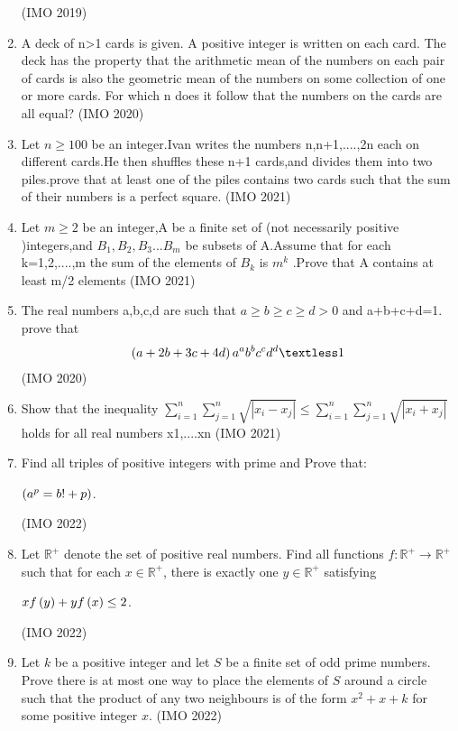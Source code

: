 \begin{enumerate}
\begin{enumerate}
\end{enumerate}
\hfill(IMO 2019)
\item A deck of n\textgreater1 cards is given. A positive integer is written on each card. The deck
has the property that the arithmetic mean of the numbers on each pair of cards is also the geometric
mean of the numbers on some collection of one or more cards.
For which n does it follow that the numbers on the cards are all equal?
\hfill(IMO 2020)
\item Let $ n\geq 100$ be an integer.Ivan writes the numbers n,n+1,....,2n each on different cards.He then shuffles these n+1 cards,and divides them into two piles.prove that at least one of the piles contains two cards such that the sum of their numbers is a perfect square.
\hfill(IMO 2021)
\item Let $ m \geq 2$ be an integer,A be a finite set of (not necessarily positive )integers,and $B_{1},B_{2},B_{3}...B_{m}$ be subsets of A.Assume that for each k=1,2,....,m the sum of the elements of $B_{k}$ is $m^k$ .Prove that A contains at least m/2 elements
\hfill(IMO 2021)
\item The real numbers a,b,c,d are such that  $a\geq b\geq c\geq d>0$ and a+b+c+d=1. prove that
\begin{align}
    \brak {a+2b+3c+4d}a^a b^b c^c d^d \textless 1
\end{align}
\hfill(IMO 2020)
\item Show that the inequality
$\sum_{i=1}^{n}\sum_{j=1}^{n}\sqrt{|x_{i}-x_{j}|}\le\sum_{i=1}^{n}\sum_{j=1}^{n}\sqrt{|x_{i}+x_{j}|}$
holds for all real numbers x1,....xn
\hfill(IMO 2021)
\item
Find all triples   of positive integers with   prime and Prove that: 
\begin{center}
$\left( a^{p} = b! + p \right)$.
\end{center} \hfill(IMO 2022)
\item
Let \( \mathbb{R}^{+} \) denote the set of positive real numbers. Find all functions \( f: \mathbb{R}^{+} \to \mathbb{R}^{+} \) such that for each \( x \in \mathbb{R}^{+} \), there is exactly one \( y \in \mathbb{R}^{+} \) satisfying \\ 
\begin{center}\( xf\left(y\right) + y f\left(x\right) \leq 2 \).\end{center}
\hfill(IMO 2022)
\item
Let  $k$  be a positive integer and let  $S$  be a finite set of odd prime numbers. Prove there is at most one way  to place the elements of  $S$  around a circle such that the product of any two neighbours is of the form  $x^{2} + x + k$  for some positive integer  $x$. \hfill(IMO 2022)

\end{enumerate}

